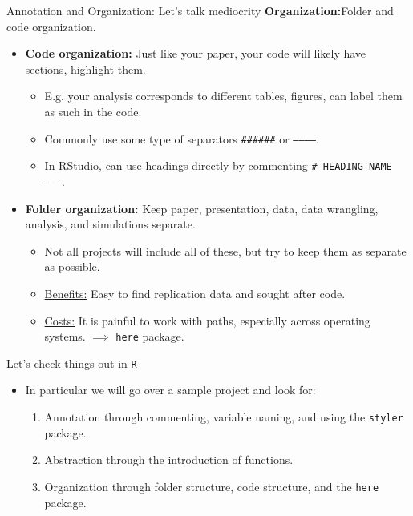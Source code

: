 \documentclass[aspectratio=169,xcolor=dvipsnames]{beamer}
\begin{document}
\begin{frame}[t]{Annotation and Organization: Let's talk mediocrity}
  \textbf{Organization:}\pause Folder and code organization.\pause
  \begin{itemize}
    \item \textbf{Code organization:} Just like your paper, \alert{your code will likely have sections, highlight them}.\pause
    \begin{itemize}
      \item E.g. your analysis corresponds to different tables, figures, can label them as such in the code.\pause
      \item Commonly use some type of separators \texttt{\#\#\#\#\#\#} or \texttt{-----------}.\pause
      \item In RStudio, can use headings directly by commenting \texttt{\# HEADING NAME --------}.
    \end{itemize}
    \item \textbf{Folder organization:} Keep paper, presentation, data, data wrangling, analysis, and simulations separate.\pause
    \begin{itemize}
      \item Not all projects will include all of these, but try to keep them as separate as possible.\pause
      \item \underline{Benefits:} Easy to find replication data and sought after code.\pause
      \item \underline{Costs:} It is painful to work with paths, especially across operating systems. \pause $\implies$ \texttt{here} package.
    \end{itemize}
  \end{itemize}
\end{frame}


\begin{frame}[t]{Let's check things out in \texttt{R}}
  \begin{itemize}
    \item In particular we will go over a sample project and look for:\pause
    \begin{enumerate}
      \item Annotation through commenting, variable naming, and using the \texttt{styler} package.\pause\vspace{1em}
      \item Abstraction through the introduction of functions.\pause\vspace{1em}
      \item Organization through folder structure, code structure, and the \texttt{here} package.
    \end{enumerate}
  \end{itemize}
\end{frame}
\end{document}
